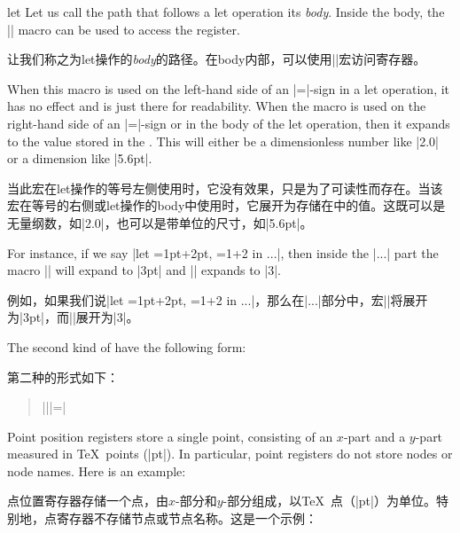 \begin{pathoperation}{let}{
        }
    Let us call the path that follows a let operation its \emph{body}. Inside
    the body, the |\n| macro can be used to access the register.
    
    让我们称之为let操作的\emph{body}的路径。在body内部，可以使用|\n|宏访问寄存器。

    \begin{command}{\n{}}
        When this macro is used on the left-hand side of an |=|-sign in a let
        operation, it has no effect and is just there for readability. When the
        macro is used on the right-hand side of an |=|-sign or in the body of
        the let operation, then it expands to the value stored in the
        . This will either be a dimensionless number like
        |2.0| or a dimension like |5.6pt|.

        当此宏在let操作的等号左侧使用时，它没有效果，只是为了可读性而存在。当该宏在等号的右侧或let操作的body中使用时，它展开为存储在中的值。这既可以是无量纲数，如|2.0|，也可以是带单位的尺寸，如|5.6pt|。

        For instance, if we say |let ={1pt+2pt}, ={1+2} in ...|, then
        inside the |...| part the macro || will expand to |3pt| and ||
        expands to |3|.

        例如，如果我们说|let ={1pt+2pt}, ={1+2} in ...|，那么在|...|部分中，宏||将展开为|3pt|，而||展开为|3|。
    \end{command}

    The second kind of  have the following form:

    第二种的形式如下：
    \begin{quote}
        |\p||=|
    \end{quote}
    Point position registers store a single point, consisting of an $x$-part
    and a $y$-part measured in \TeX\ points (|pt|). In particular, point
    registers do not store nodes or node names. Here is an example:
    
    点位置寄存器存储一个点，由$x$-部分和$y$-部分组成，以\TeX\ 点（|pt|）为单位。特别地，点寄存器不存储节点或节点名称。这是一个示例：

\begin{codeexample}[preamble={\usetikzlibrary{calc}}]
\end{codeexample}


\end{pathoperation}
